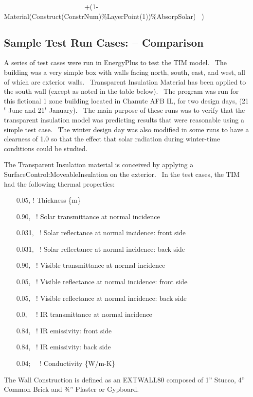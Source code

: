 ~~~~~~~~~~~~~~~~~~~~~~~ +(1-Material(Construct(ConstrNum)\%LayerPoint(1))\%AbsorpSolar)~ )

\subsection{Sample Test Run Cases: -- Comparison}\label{sample-test-run-cases-comparison}

A series of test cases were run in EnergyPlus to test the TIM model.~ The building was a very simple box with walls facing north, south, east, and west, all of which are exterior walls.~ Transparent Insulation Material has been applied to the south wall (except as noted in the table below).~ The program was run for this fictional 1 zone building located in Chanute AFB IL, for two design days, (21\(^{t}\) June and 21\(^{t}\) January).~ The main purpose of these runs was to verify that the transparent insulation model was predicting results that were reasonable using a simple test case.~ The winter design day was also modified in some runs to have a clearness of 1.0 so that the effect that solar radiation during winter-time conditions could be studied.

The Transparent Insulation material is conceived by applying a SurfaceControl:MoveableInsulation on the exterior.~ In the test cases, the TIM had the following thermal properties:

~~~ 0.05, ! Thickness \{m\}

~~~ 0.90,~ ! Solar transmittance at normal incidence

~~~ 0.031,~ ! Solar reflectance at normal incidence: front side

~~~ 0.031,~ ! Solar reflectance at normal incidence: back side

~~~ 0.90,~ ! Visible transmittance at normal incidence

~~~ 0.05,~ ! Visible reflectance at normal incidence: front side

~~~ 0.05,~ ! Visible reflectance at normal incidence: back side

~~~ 0.0,~~ ! IR transmittance at normal incidence

~~~ 0.84,~ ! IR emissivity: front side

~~~ 0.84,~ ! IR emissivity: back side

~~~ 0.04;~~ ! Conductivity \{W/m-K\}

The Wall Construction is defined as an EXTWALL80 composed of 1'' Stucco, 4'' Common Brick and ¾'' Plaster or Gypboard.

